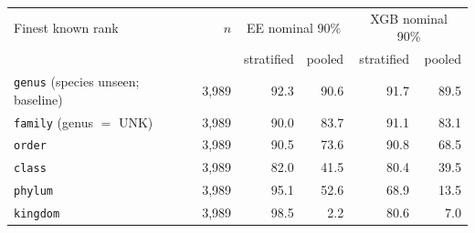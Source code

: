 \begin{tabular}{lrrrrr}
\toprule
Finest known rank & $n$ & \multicolumn{2}{c}{EE nominal 90\%} & \multicolumn{2}{c}{XGB nominal 90\%} \\
 & & stratified & pooled & stratified & pooled \\
\midrule
\texttt{genus} (species unseen; baseline) & 3{,}989 & 92.3 & 90.6 & 91.7 & 89.5 \\
\texttt{family} (genus $=$ UNK) & 3{,}989 & 90.0 & 83.7 & 91.1 & 83.1 \\
\texttt{order} & 3{,}989 & 90.5 & 73.6 & 90.8 & 68.5 \\
\texttt{class} & 3{,}989 & 82.0 & 41.5 & 80.4 & 39.5 \\
\texttt{phylum} & 3{,}989 & 95.1 & 52.6 & 68.9 & 13.5 \\
\texttt{kingdom} & 3{,}989 & 98.5 & 2.2 & 80.6 & 7.0 \\
\bottomrule
\end{tabular}
